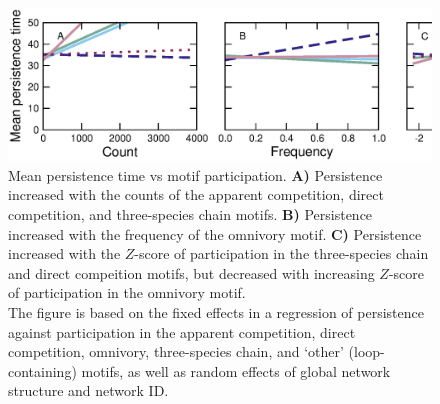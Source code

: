 \documentclass[12pt]{article}
\begin{document}
    \clearpage

    \begin{figure}[ht!]
        \centering
        \includegraphics[width=\textwidth]{figures/roles/persistence_vs_motifs.eps}
        \caption{Mean persistence time vs motif participation. \textbf{A)} Persistence increased with the counts of the apparent competition, direct competition, and three-species chain motifs. \textbf{B)} Persistence increased with the frequency of the omnivory motif. \textbf{C)} Persistence increased with the $Z$-score of participation in the three-species chain and direct compeition motifs, but decreased with increasing $Z$-score of participation in the omnivory motif. \\The figure is based on the fixed effects in a regression of persistence against participation in the apparent competition, direct competition, omnivory, three-species chain, and `other' (loop-containing) motifs, as well as random effects of global network structure and network ID.}
        \label{fig:persistence_motifs}
    \end{figure}
\end{document}

